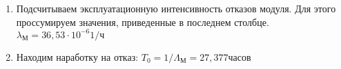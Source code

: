 \begin{enumerate}
\begin{sidewaystable}
\begin{tabular}{|l |l |l |l |l |l |l |l |l |l |l |l |l |l |l |l |l |l |l |l |}
  \end{tabular}
\end{sidewaystable}

\item Подсчитываем эксплуатационную интенсивность отказов модуля.
  Для этого проссумируем значения, приведенные в последнем столбце.
  $\lambda_{\text{М}} = 36,53 \cdot 10^{-6} \text{1/ч}$
  
\item Находим наработку на отказ:
  $T_0 = 1 / \Lambda_{\text{М}} = 27,377 \text{часов}$
\end{enumerate}


\newpage

